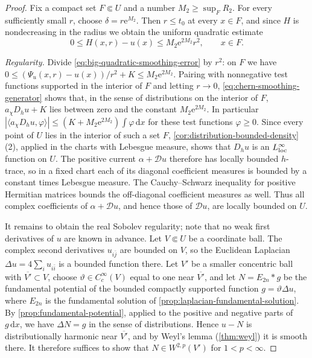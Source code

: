 \begin{proof}
Fix a compact set $F\Subset U$ and a number $M_2\geq\sup_FR_2$. For every sufficiently small $r$, choose $\delta=r\mathrm e^{M_2}$. Then $r\leq t_0$ at every $x\in F$, and since $H$ is nondecreasing in the radius we obtain the uniform quadratic estimate
\begin{equation}\label{eq:big-quadratic-smoothing-error}
 0\leq H(x,r)-u(x)\leq M_2\mathrm e^{2M_2}r^2,
 \qquad x\in F.
\end{equation}

\emph{Regularity.} Divide \eqref{eq:big-quadratic-smoothing-error} by $r^2$: on $F$ we have $0\leq(\Psi_u(x,r)-u(x))/r^2+K\leq M_2\mathrm e^{2M_2}$. Pairing with nonnegative test functions supported in the interior of $F$ and letting $r\to0$, \eqref{eq:chern-smoothing-generator} shows that, in the sense of distributions on the interior of $F$, $a_\chi D_hu+K$ lies between zero and the constant $M_2\mathrm e^{2M_2}$. In particular $|\langle a_\chi D_hu,\varphi\rangle|\leq(K+M_2\mathrm e^{2M_2})\int\varphi\,\mathrm dx$ for these test functions $\varphi\geq0$. Since every point of $U$ lies in the interior of such a set $F$, \cref{cor:distribution-bounded-density}(2), applied in the charts with Lebesgue measure, shows that $D_hu$ is an $L^\infty_{\mathrm{loc}}$ function on $U$. The positive current $\alpha+\mathcal Du$ therefore has locally bounded $h$-trace, so in a fixed chart each of its diagonal coefficient measures is bounded by a constant times Lebesgue measure. The Cauchy--Schwarz inequality for positive Hermitian matrices bounds the off-diagonal coefficient measures as well. Thus all complex coefficients of $\alpha+\mathcal Du$, and hence those of $\mathcal Du$, are locally bounded on $U$.

It remains to obtain the real Sobolev regularity; note that no weak first derivatives of $u$ are known in advance. Let $V\Subset U$ be a coordinate ball. The complex second derivatives $u_{i\bar j}$ are bounded on $V$, so the Euclidean Laplacian $\Delta u=4\sum_iu_{i\bar i}$ is a bounded function there. Let $V'$ be a smaller concentric ball with $\overline{V'}\subset V$, choose $\vartheta\in C^\infty_c(V)$ equal to one near $\overline{V'}$, and let $N=E_{2n}*g$ be the fundamental potential of the bounded compactly supported function $g=\vartheta\Delta u$, where $E_{2n}$ is the fundamental solution of \cref{prop:laplacian-fundamental-solution}. By \cref{prop:fundamental-potential}, applied to the positive and negative parts of $g\,\mathrm dx$, we have $\Delta N=g$ in the sense of distributions. Hence $u-N$ is distributionally harmonic near $\overline{V'}$, and by Weyl's lemma (\cref{thm:weyl}) it is smooth there. It therefore suffices to show that $N\in W^{2,p}(V')$ for $1<p<\infty$.


\end{proof}
